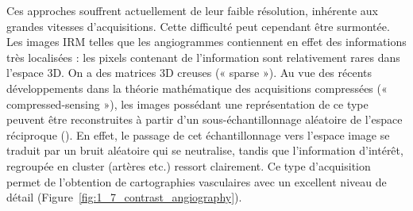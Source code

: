 Ces approches souffrent actuellement de leur faible résolution, inhérente aux grandes vitesses d’acquisitions. Cette difficulté peut cependant être surmontée. Les images IRM telles que les angiogrammes contiennent en effet des informations très localisées : les pixels contenant de l’information sont relativement rares dans l’espace 3D. On a des matrices 3D creuses (« sparse »). Au vue des récents développements dans la théorie mathématique des acquisitions compressées (« compressed-sensing »), les images possédant une représentation de ce type peuvent être reconstruites à partir d’un sous-échantillonnage aléatoire de l’espace réciproque (\cite{Lustig2007}). En effet, le passage de cet échantillonnage vers l’espace image se traduit par un bruit aléatoire qui se neutralise, tandis que l’information d’intérêt, regroupée en cluster (artères etc.) ressort clairement. Ce type d’acquisition permet de l’obtention de cartographies vasculaires avec un excellent niveau de détail (Figure~\ref{fig:1_7_contrast_angiography}).


